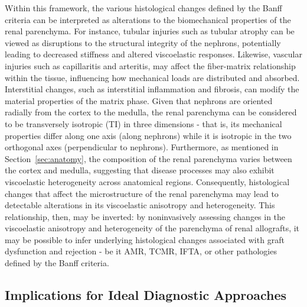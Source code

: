 Within this framework, the various histological changes defined by the Banff criteria can be interpreted as alterations to the biomechanical properties of the renal parenchyma. For instance, tubular injuries such as tubular atrophy can be viewed as disruptions to the structural integrity of the nephrons, potentially leading to decreased stiffness and altered viscoelastic responses. Likewise, vascular injuries such as capillaritis and arteritis, may affect the fiber-matrix relationship within the tissue, influencing how mechanical loads are distributed and absorbed. Interstitial changes, such as interstitial inflammation and fibrosis, can modify the material properties of the matrix phase. Given that nephrons are oriented radially from the cortex to the medulla, the renal parenchyma can be considered to be transversely isotropic (TI) in three dimensions - that is, its mechanical properties differ along one axis (along nephrons) while it is isotropic in the two orthogonal axes (perpendicular to nephrons). Furthermore, as mentioned in Section~\ref{sec:anatomy}, the composition of the renal parenchyma varies between the cortex and medulla, suggesting that disease processes may also exhibit viscoelastic heterogeneity across anatomical regions. Consequently, histological changes that affect the microstructure of the renal parenchyma may lead to detectable alterations in its viscoelastic anisotropy and heterogeneity. This relationship, then, may be inverted: by noninvasively assessing changes in the viscoelastic anisotropy and heterogeneity of the parenchyma of renal allografts, it may be possible to infer underlying histological changes associated with graft dysfunction and rejection - be it AMR, TCMR, IFTA, or other pathologies defined by the Banff criteria.

\subsection{Implications for Ideal Diagnostic Approaches}


